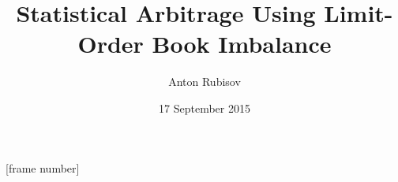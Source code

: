 \title[Arbitrage with Order Imbalance]{Statistical Arbitrage Using Limit-Order Book Imbalance}
\author{Anton Rubisov}
\date{17 September 2015}
\beamertemplatenavigationsymbolsempty
{}
[frame number]

\usepackage{booktabs}
\usepackage{adjustbox}
\usepackage{subfig}
\usepackage{bm} 			%
\usepackage{dsfont} 		%

\DeclareMathOperator{\sgn}{\mathrm{sgn}}
\renewcommand{\d}{\ensuremath{\,\mathrm{d}}}
\renewcommand{\P}{\mathbb{P}}
\newcommand{\E}{\mathbb{E}}
\newcommand{\bZ}{\bm{Z}}
\newcommand{\bz}{\bm{z}}
\newcommand{\btau}{\bm{\tau}}
\newcommand{\cF}{\mathcal{F}}
\newcommand{\cA}{\mathcal{A}}
\newcommand{\cL}{\mathcal{L}}
\newcommand{\indicator}{\mathds{1}}
\newcommand{\mat}[1]{\boldsymbol{#1}}
\newcommand{\ra}[1]{\renewcommand{\arraystretch}{#1}}
\newcommand\simcal[1]{\stackrel{\sim}{\smash{\mathcal{#1}}\rule{0pt}{1.2ex}}}

